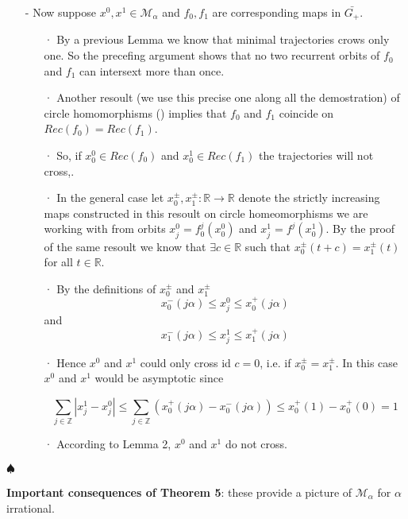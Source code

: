 \documentclass{article}
\begin{document}
\begin{itemize}
			\item[-] Now suppose $x^{0}, x^{1} \in \mathcal{M}_{\alpha}$ and $f_{0}, f_{1}$ are corresponding maps in $\bar{G_{+}}$. 
				\begin{itemize}
					\item[·] By a previous Lemma we know that minimal trajectories crows only one. So the precefing argument shows that no two recurrent orbits of $f_{0}$ and $f_{1}$ can intersext more than once.
					\item[·] Another resoult (we use this precise one along all the demostration) of circle homomorphisms (\cite{R1}) implies that $f_0$ and $f_1$ coincide on $Rec(f_0 ) = Rec ( f_1 )$. 
					\item[·] So, if $x_{0}^{0} \in Rec(f_0)$ and $x_{0}^{1} \in Rec(f_1)$ the trajectories will not cross,.
					\item[·] In the general case let $x_{0}^{\pm}, x_{1}^{\pm}: \mathbb{R} \rightarrow \mathbb{R}$ denote the strictly increasing maps constructed in this resoult on circle homeomorphisms we are working with from orbits $x_{j}^{0} = f_{0}^{j} (x_{0}^{0})$ and $x_{j}^{1} = f_{}^{j} (x_{0}^{1})$. By the proof of the same resoult we know that $\exists c \in \mathbb{R}$ such that $x_{0}^{\pm} (t + c) = x_{1}^{\pm} (t)$ for all $t \in \mathbb{R}$. 
					\item[·] By the definitions of $x_{0}^{\pm}$ and $x_{1}^{\pm}$
						$$
							x_{0}^{-} (j \alpha ) \leq x_{j}^{0} \leq x_{0}^{+} ( j \alpha )
						$$
					and
						$$
							x_{1}^{-} (j \alpha ) \leq x_{j}^{1} \leq x_{1}^{+} ( j \alpha )
						$$
					\item[·] Hence $x^{0}$ and $x^{1}$ could only cross id $c = 0$, i.e. if $x_{0}^{\pm} = x_{1}^{\pm}$. In this case $x^{0}$ and $x^{1}$ would be asymptotic since
					
						$$
							\sum_{j \in \mathbb{Z}} | x_{j}^{1} - x_{j}^{0} | \leq \sum_{j \in \mathbb{Z}}  ( x_{0}^{+} (j \alpha) - x_{0}^{-} (j \alpha) ) \leq x_{0}^{+} (1) - x_{0}^{+} (0) = 1
						$$
					\item[·] According to Lemma 2, $x^{0}$ and $x^{1}$ do not cross.
				\end{itemize}
		\end{itemize}
	
	\noindent $\spadesuit$
\color{black}

\noindent \textbf{Important consequences of Theorem 5}: these provide a picture of $\mathcal{M}_{\alpha}$ for $\alpha$ irrational.
\end{document}
